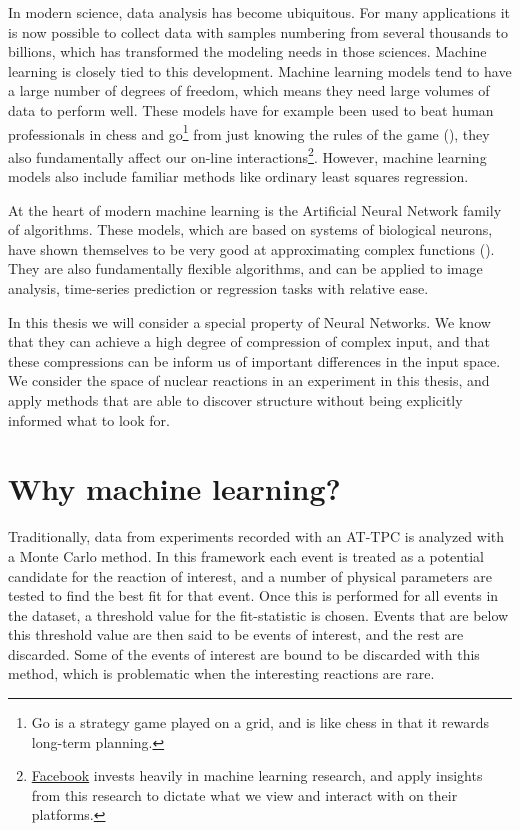 In modern science, data analysis has become ubiquitous. For many applications it is now possible to collect data with samples numbering from several thousands to billions, which has transformed the modeling needs in those sciences. Machine learning is closely tied to this development. Machine learning models tend to have a large number of degrees of freedom, which means they need large volumes of data to perform well. These models have for example been used to beat human professionals in chess and go\footnote{Go is a strategy game played on a grid, and is like chess in that it rewards long-term planning.} from just knowing the rules of the game (\cite{Silver2017}), they also fundamentally affect our on-line interactions\footnote{\href{https://research.fb.com/category/machine-learning/}{Facebook} invests heavily in machine learning research, and apply insights from this research to dictate what we view and interact with on their platforms.}. However, machine learning models also include familiar methods like ordinary least squares regression. 

At the heart of modern machine learning is the Artificial Neural Network family of algorithms. These models, which are based on systems of biological neurons, have shown themselves to be very good at approximating complex functions (\cite{Lin2017}). They are also fundamentally flexible algorithms, and can be applied to image analysis, time-series prediction or regression tasks with relative ease.

In this thesis we will consider a special property of Neural Networks. We know that they can achieve a high degree of compression of complex input, and that these compressions can be inform us of important differences in the input space. We consider the space of nuclear reactions in an experiment in this thesis, and apply methods that are able to discover structure without being explicitly informed what to look for.

\section{Why machine learning?}

Traditionally, data from experiments recorded with an AT-TPC is analyzed with a Monte Carlo method. In this framework each event is treated as a potential candidate for the reaction of interest, and a number of physical parameters are tested to find the best fit for that event. Once this is performed for all events in the dataset, a threshold value for the fit-statistic is chosen. Events that are below this threshold value are then said to be events of interest, and the rest are discarded. Some of the events of interest are bound to be discarded with this method, which is problematic when the interesting reactions are rare. 


